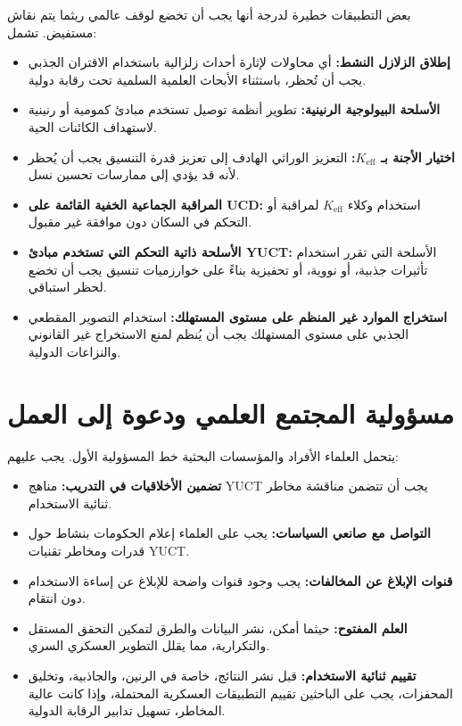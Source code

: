 \documentclass[12pt,a4paper]{article}
\theoremstyle{remark}
\newcommand{\Keff}{K_{\mathrm{eff}}}
\begin{document}
	بعض التطبيقات خطيرة لدرجة أنها يجب أن تخضع لوقف عالمي ريثما يتم نقاش مستفيض. تشمل:
	\begin{itemize}[leftmargin=*]
		\item \textbf{إطلاق الزلازل النشط:} أي محاولات لإثارة أحداث زلزالية باستخدام الاقتران الجذبي يجب أن تُحظر، باستثناء الأبحاث العلمية السلمية تحت رقابة دولية.
		\item \textbf{الأسلحة البيولوجية الرنينية:} تطوير أنظمة توصيل تستخدم مبادئ كمومية أو رنينية لاستهداف الكائنات الحية.
		\item \textbf{اختيار الأجنة بـ \(\Keff\):} التعزيز الوراثي الهادف إلى تعزيز قدرة التنسيق يجب أن يُحظر لأنه قد يؤدي إلى ممارسات تحسين نسل.
		\item \textbf{المراقبة الجماعية الخفية القائمة على UCD:} استخدام وكلاء \(\Keff\) لمراقبة أو التحكم في السكان دون موافقة غير مقبول.
		\item \textbf{الأسلحة ذاتية التحكم التي تستخدم مبادئ YUCT:} الأسلحة التي تقرر استخدام تأثيرات جذبية، أو نووية، أو تحفيزية بناءً على خوارزميات تنسيق يجب أن تخضع لحظر استباقي.
		\item \textbf{استخراج الموارد غير المنظم على مستوى المستهلك:} استخدام التصوير المقطعي الجذبي على مستوى المستهلك يجب أن يُنظم لمنع الاستخراج غير القانوني والنزاعات الدولية.
	\end{itemize}
	
	\section{مسؤولية المجتمع العلمي ودعوة إلى العمل}
	\label{sec:scientists}
	
	يتحمل العلماء الأفراد والمؤسسات البحثية خط المسؤولية الأول. يجب عليهم:
	\begin{itemize}[leftmargin=*]
		\item \textbf{تضمين الأخلاقيات في التدريب:} مناهج YUCT يجب أن تتضمن مناقشة مخاطر ثنائية الاستخدام.
		\item \textbf{التواصل مع صانعي السياسات:} يجب على العلماء إعلام الحكومات بنشاط حول قدرات ومخاطر تقنيات YUCT.
		\item \textbf{قنوات الإبلاغ عن المخالفات:} يجب وجود قنوات واضحة للإبلاغ عن إساءة الاستخدام دون انتقام.
		\item \textbf{العلم المفتوح:} حيثما أمكن، نشر البيانات والطرق لتمكين التحقق المستقل والتكرارية، مما يقلل التطوير العسكري السري.
		\item \textbf{تقييم ثنائية الاستخدام:} قبل نشر النتائج، خاصة في الرنين، والجاذبية، وتخليق المحفزات، يجب على الباحثين تقييم التطبيقات العسكرية المحتملة، وإذا كانت عالية المخاطر، تسهيل تدابير الرقابة الدولية.
	\end{itemize}
	
\end{document}
